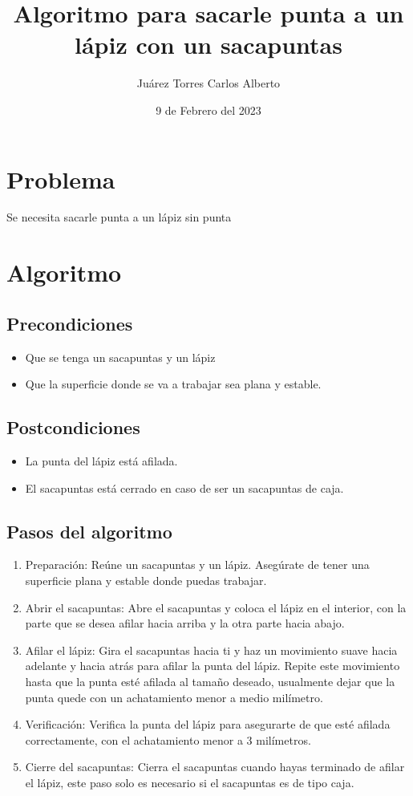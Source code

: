 \documentclass{article}
\title{Algoritmo para sacarle punta a un lápiz con un sacapuntas}
\author{Juárez Torres Carlos Alberto}
\date{9 de Febrero del 2023}
\begin{document}
\maketitle

\section*{Problema}
Se necesita sacarle punta a un lápiz sin punta
\section*{Algoritmo}
\subsection*{Precondiciones}
\begin{itemize}
    \item Que se tenga un sacapuntas y un lápiz
    \item Que la superficie donde se va a trabajar sea plana y estable.
\end{itemize}
\subsection*{Postcondiciones}
\begin{itemize}
    \item La punta del lápiz está afilada.
    \item El sacapuntas está cerrado en caso de ser un sacapuntas de caja.
\end{itemize}

\subsection*{Pasos del algoritmo}
\begin{enumerate}
    \item   Preparación: Reúne un sacapuntas y un lápiz. Asegúrate de tener una superficie plana y estable donde puedas trabajar.
    \item   Abrir el sacapuntas: Abre el sacapuntas y coloca el lápiz en el interior, con la parte que se desea afilar hacia arriba y la otra parte hacia abajo.
    \item   Afilar el lápiz: Gira el sacapuntas hacia ti y haz un movimiento suave hacia adelante y hacia atrás para afilar la punta del lápiz. Repite este movimiento hasta que la punta esté afilada al tamaño deseado, usualmente dejar que la punta quede con un achatamiento menor a medio milímetro.
    \item   Verificación: Verifica la punta del lápiz para asegurarte de que esté afilada correctamente, con el achatamiento menor a 3 milímetros.
    \item   Cierre del sacapuntas: Cierra el sacapuntas cuando hayas terminado de afilar el lápiz, este paso solo es necesario si el sacapuntas es de tipo caja.


\end{enumerate}
\end{document}
